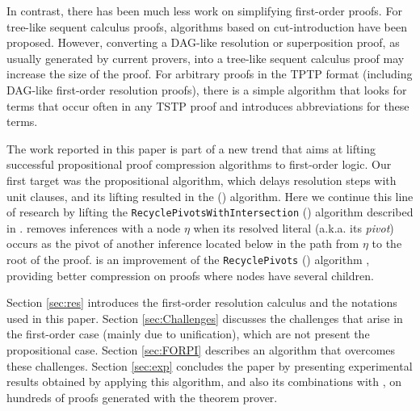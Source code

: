 \documentclass{llncs}
\begin{document}
In contrast, there has been much less work on simplifying first-order proofs. For tree-like sequent calculus proofs, algorithms based on cut-introduction \cite{BrunoLPAR,Hetzl} have been proposed. However, converting a DAG-like resolution or superposition proof, as usually generated by current provers, into a tree-like sequent calculus proof may increase the size of the proof. For arbitrary proofs in the TPTP \cite{TPTP} format (including DAG-like first-order resolution proofs), there is a simple algorithm \cite{LPARCzech} that looks for terms that occur often in any TSTP \cite{TPTP} proof and introduces abbreviations for these terms. 

The work reported in this paper is part of a new trend that aims at lifting successful propositional proof compression algorithms to first-order logic. Our first target was the propositional {\LowerUnits} algorithm, which delays resolution steps with unit clauses, and its lifting resulted in the 
{\SFOLowerUnits} 
({\GFOLU}) algorithm. Here we continue this line of research by lifting the 
\texttt{Recycle\-PivotsWithIntersection}
({\RPI}) algorithm described in \cite{}. {\RPI} removes inferences with a node $\eta$ when its resolved literal (a.k.a. its \emph{pivot}) occurs as the pivot of another inference located below in the path from $\eta$ to the root of the proof. {\RPI} is an improvement of the \texttt{RecyclePivots} ({\RP}) algorithm \cite{Bar-IlanFuhrmannHooryShachamStrichman2009Linear-time-reductions-of-resolution-proofs}, providing better compression on proofs where nodes have several children.

Section \ref{sec:res} introduces the first-order resolution calculus and the notations used in this paper. Section \ref{sec:Challenges} discusses the challenges that arise in the first-order case (mainly due to unification), which are not present the propositional case. Section \ref{sec:FORPI} describes an algorithm that overcomes these challenges. Section \ref{sec:exp} concludes the paper by presenting experimental results obtained by applying this algorithm, and also its combinations with {\GFOLU}, on hundreds of proofs generated with the {\SPASS} theorem prover. 








%

%
%


\end{document}
